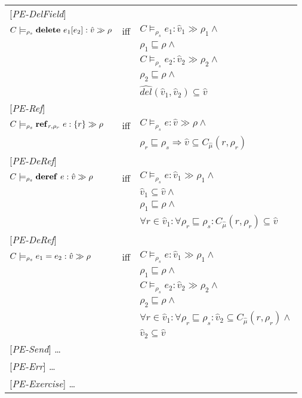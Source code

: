 \documentclass[[12pt,a4paper,twoside,openrigh]{article}
\newcommand{\vat}[0]{\hat{v}}
\newcommand{\modelrho}{\models_{\rho_s}}
\newcommand{\caesti}[2]{C \modelrho #1 : \vat_{#2} \gg \rho_{#2}}
\newcommand{\caest}[1]{C \modelrho #1 : \vat \gg \rho}
\begin{document}
\begin{tabular} {l l l}
{[\textit{PE-DelField}]}\\
$\caest {\delete {e_1} {e_2}} $& iff &$ \caesti {e_1} {1} \wedge $\\
&& $\rho_1 \sqsubseteq \rho \wedge$ \\
&& $ \caesti {e_2} {2} \wedge $ \\
&& $\rho_2 \sqsubseteq \rho \wedge$ \\
&& $\widehat{del} (\vat_1, \vat_2) \subseteq \vat$\\
{[\textit{PE-Ref}]}\\
$ C \modelrho \newref {r,\rho_r} {e} :\{r\} \gg \rho $& iff &$ \caest {e} \wedge $\\
&& $\rho_r \sqsubseteq \rho_s \Rightarrow \vat \subseteq C_{\hat{\mu}}(r, \rho_r) $ \\
{[\textit{PE-DeRef}]}\\
$\caest {\deref {e}} $& iff &$ \caesti {e} {1} \wedge $\\
&& $\vat_1 \subseteq \vat \wedge$ \\
&& $\rho_1 \sqsubseteq \rho \wedge$ \\
&& $\forall r \in \vat_1 : \forall \rho_r \sqsubseteq \rho_s : C_{\hat{\mu}}(r, \rho_r) \subseteq \vat$ \\
{[\textit{PE-DeRef}]}\\
$\caest {\setref {e_1} {e_2}} $& iff &$ \caesti {e} {1} \wedge $\\
&& $\rho_1 \sqsubseteq \rho \wedge$ \\
&& $ \caesti {e_2} {2} \wedge $ \\
&& $\rho_2 \sqsubseteq \rho \wedge$ \\
&& $\forall r \in \vat_1 : \forall \rho_r \sqsubseteq \rho_s : \vat_2 \subseteq C_{\hat{\mu}}(r, \rho_r) \wedge$ \\
&& $\vat_2 \subseteq \vat $ \\
{[\textit{PE-Send}]} \dots \\
{[\textit{PE-Err}]} \dots \\
{[\textit{PE-Exercise}]} \dots \\
\end{tabular}
\end{document}
